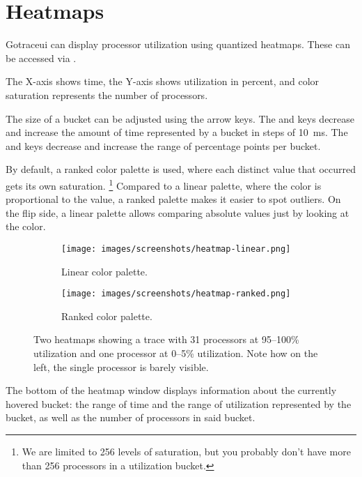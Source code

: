 \documentclass[10pt,letterpaper,oneside,openany,english]{memoir}
\begin{document}
\section{Heatmaps}

Gotraceui can display processor utilization using quantized heatmaps.
These can be accessed via .

The X-axis shows time, the Y-axis shows utilization in percent, and color saturation represents the number of processors.

The size of a bucket can be adjusted using the arrow keys. The \keys{\arrowkey{<}} and \keys{\arrowkey{>}} keys decrease and increase the amount of time represented by a bucket in steps of \qty{10}{\milli\second}.
The  and \keys{\arrowkey{^}} keys decrease and increase the range of percentage points per bucket.

By default, a ranked color palette is used, where each distinct value that occurred gets its own saturation.%
\footnote{We are limited to 256 levels of saturation, but you probably don't have more than 256 processors in a utilization bucket.}
Compared to a linear palette, where the color is proportional to the value, a ranked palette makes it easier to spot outliers.
On the flip side, a linear palette allows comparing absolute values just by looking at the color.

\begin{figure}[h]
  \centering
  \begin{subfigure}[b]{0.49\textwidth}
    \centering
    \texttt{[image: images/screenshots/heatmap-linear.png]}
    \caption{Linear color palette.}
  \end{subfigure}
  \hfill
  \begin{subfigure}[b]{0.49\textwidth}
    \centering
    \texttt{[image: images/screenshots/heatmap-ranked.png]}
    \caption{Ranked color palette.}
  \end{subfigure}

  \caption{Two heatmaps showing a trace with 31 processors at 95--100\% utilization and one processor at 0--5\% utilization. Note how on the left, the single processor is barely visible.}
\end{figure}

The bottom of the heatmap window displays information about the currently hovered bucket:
the range of time and the range of utilization represented by the bucket, as well as the number of processors in said bucket.
\end{document}

